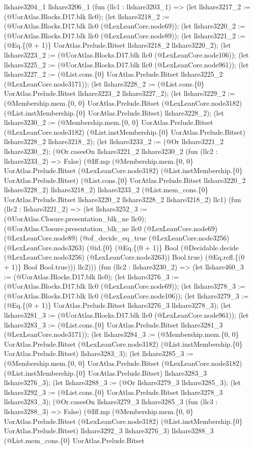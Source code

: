 \documentclass[11pt]{article}
\begin{document}
llshare3204\_1 llshare3206\_1 (fun (llc1 : llshare3203\_1) => (let llshare3217\_2 := (@UorAtlas.Blocks.D17.blk llc0); (let llshare3218\_2 := (@UorAtlas.Blocks.D17.blk llc0 (@LexLeanCore.node69)); (let llshare3220\_2 := (@UorAtlas.Blocks.D17.blk llc0 (@LexLeanCore.node89)); (let llshare3221\_2 := (@Eq.\{(0 + 1)\} UorAtlas.Prelude.Bitset llshare3218\_2 llshare3220\_2); (let llshare3223\_2 := (@UorAtlas.Blocks.D17.blk llc0 (@LexLeanCore.node106)); (let llshare3225\_2 := (@UorAtlas.Blocks.D17.blk llc0 (@LexLeanCore.node961)); (let llshare3227\_2 := (@List.cons.\{0\} UorAtlas.Prelude.Bitset llshare3225\_2 (@LexLeanCore.node3171)); (let llshare3228\_2 := (@List.cons.\{0\} UorAtlas.Prelude.Bitset llshare3223\_2 llshare3227\_2); (let llshare3229\_2 := (@Membership.mem.\{0, 0\} UorAtlas.Prelude.Bitset (@LexLeanCore.node3182) (@List.instMembership.\{0\} UorAtlas.Prelude.Bitset) llshare3228\_2); (let llshare3230\_2 := (@Membership.mem.\{0, 0\} UorAtlas.Prelude.Bitset (@LexLeanCore.node3182) (@List.instMembership.\{0\} UorAtlas.Prelude.Bitset) llshare3228\_2 llshare3218\_2); (let llshare3233\_2 := (@Or llshare3221\_2 llshare3230\_2); (@Or.casesOn llshare3221\_2 llshare3230\_2 (fun (llc2 : llshare3233\_2) => False) (@Iff.mp (@Membership.mem.\{0, 0\} UorAtlas.Prelude.Bitset (@LexLeanCore.node3182) (@List.instMembership.\{0\} UorAtlas.Prelude.Bitset) (@List.cons.\{0\} UorAtlas.Prelude.Bitset llshare3220\_2 llshare3228\_2) llshare3218\_2) llshare3233\_2 (@List.mem\_cons.\{0\} UorAtlas.Prelude.Bitset llshare3220\_2 llshare3228\_2 llshare3218\_2) llc1) (fun (llc2 : llshare3221\_2) => (let llshare3252\_3 := (@UorAtlas.Closure.presentation\_blk\_ne llc0); (@UorAtlas.Closure.presentation\_blk\_ne llc0 (@LexLeanCore.node69) (@LexLeanCore.node89) (@of\_decide\_eq\_true (@LexLeanCore.node3256) (@LexLeanCore.node3263) (@id.\{0\} (@Eq.\{(0 + 1)\} Bool (@Decidable.decide (@LexLeanCore.node3256) (@LexLeanCore.node3263)) Bool.true) (@Eq.refl.\{(0 + 1)\} Bool Bool.true))) llc2))) (fun (llc2 : llshare3230\_2) => (let llshare460\_3 := (@UorAtlas.Blocks.D17.blk llc0); (let llshare3276\_3 := (@UorAtlas.Blocks.D17.blk llc0 (@LexLeanCore.node69)); (let llshare3278\_3 := (@UorAtlas.Blocks.D17.blk llc0 (@LexLeanCore.node106)); (let llshare3279\_3 := (@Eq.\{(0 + 1)\} UorAtlas.Prelude.Bitset llshare3276\_3 llshare3278\_3); (let llshare3281\_3 := (@UorAtlas.Blocks.D17.blk llc0 (@LexLeanCore.node961)); (let llshare3283\_3 := (@List.cons.\{0\} UorAtlas.Prelude.Bitset llshare3281\_3 (@LexLeanCore.node3171)); (let llshare3284\_3 := (@Membership.mem.\{0, 0\} UorAtlas.Prelude.Bitset (@LexLeanCore.node3182) (@List.instMembership.\{0\} UorAtlas.Prelude.Bitset) llshare3283\_3); (let llshare3285\_3 := (@Membership.mem.\{0, 0\} UorAtlas.Prelude.Bitset (@LexLeanCore.node3182) (@List.instMembership.\{0\} UorAtlas.Prelude.Bitset) llshare3283\_3 llshare3276\_3); (let llshare3288\_3 := (@Or llshare3279\_3 llshare3285\_3); (let llshare3292\_3 := (@List.cons.\{0\} UorAtlas.Prelude.Bitset llshare3278\_3 llshare3283\_3); (@Or.casesOn llshare3279\_3 llshare3285\_3 (fun (llc3 : llshare3288\_3) => False) (@Iff.mp (@Membership.mem.\{0, 0\} UorAtlas.Prelude.Bitset (@LexLeanCore.node3182) (@List.instMembership.\{0\} UorAtlas.Prelude.Bitset) llshare3292\_3 llshare3276\_3) llshare3288\_3 (@List.mem\_cons.\{0\} UorAtlas.Prelude.Bitset 
\end{document}
